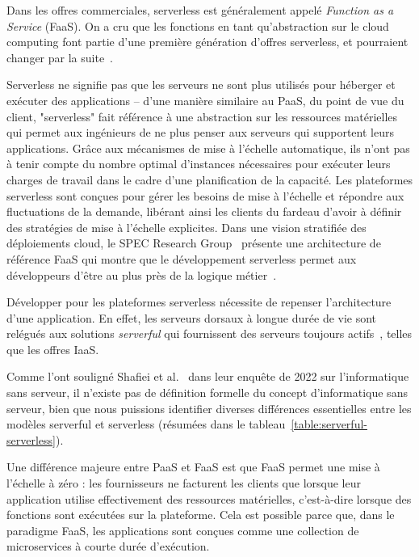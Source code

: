 Dans les offres commerciales, serverless est généralement appelé \textit{Function as a Service} (FaaS). On a cru que les fonctions en tant qu'abstraction sur le cloud computing font partie d'une première génération d'offres serverless, et pourraient changer par la suite~\cite{hellersteinServerlessComputingOne2019}.

Serverless ne signifie pas que les serveurs ne sont plus utilisés pour héberger et exécuter des applications -- d'une manière similaire au PaaS, du point de vue du client, "serverless" fait référence à une abstraction sur les ressources matérielles qui permet aux ingénieurs de ne plus penser aux serveurs qui supportent leurs applications. Grâce aux mécanismes de mise à l'échelle automatique, ils n'ont pas à tenir compte du nombre optimal d'instances nécessaires pour exécuter leurs charges de travail dans le cadre d'une planification de la capacité. Les plateformes serverless sont conçues pour gérer les besoins de mise à l'échelle et répondre aux fluctuations de la demande, libérant ainsi les clients du fardeau d'avoir à définir des stratégies de mise à l'échelle explicites. Dans une vision stratifiée des déploiements cloud, le SPEC Research Group~\cite{spec-rg} présente une architecture de référence FaaS qui montre que le développement serverless permet aux développeurs d'être au plus près de la logique métier~\cite{vaneykSPECRGCloud2018, vaneykSPECRGReferenceArchitecture2019}.

Développer pour les plateformes serverless nécessite de repenser l'architecture d'une application. En effet, les serveurs dorsaux à longue durée de vie sont relégués aux solutions \textit{serverful} qui fournissent des serveurs toujours actifs~\cite{mateiTransitionServerfullServerless2020}, telles que les offres IaaS.

Comme l'ont souligné Shafiei et al.~\cite{shafieiServerlessComputingSurvey2021} dans leur enquête de 2022 sur l'informatique sans serveur, il n'existe pas de définition formelle du concept d'informatique sans serveur, bien que nous puissions identifier diverses différences essentielles entre les modèles serverful et serverless (résumées dans le tableau~\ref{table:serverful-serverless}).

Une différence majeure entre PaaS et FaaS est que FaaS permet une mise à l'échelle à zéro : les fournisseurs ne facturent les clients que lorsque leur application utilise effectivement des ressources matérielles, c'est-à-dire lorsque des fonctions sont exécutées sur la plateforme. Cela est possible parce que, dans le paradigme FaaS, les applications sont conçues comme une collection de microservices à courte durée d'exécution.

